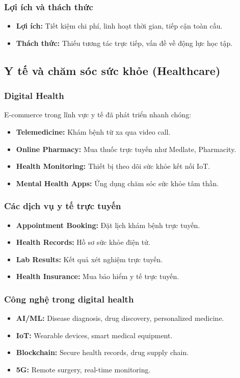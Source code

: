 \documentclass[a4paper,12pt]{report}
\begin{document}
\subsubsection{Lợi ích và thách thức}
\begin{itemize}
    \item \textbf{Lợi ích:} Tiết kiệm chi phí, linh hoạt thời gian, tiếp cận toàn cầu.
    \item \textbf{Thách thức:} Thiếu tương tác trực tiếp, vấn đề về động lực học tập.
\end{itemize}

\subsection{Y tế và chăm sóc sức khỏe (Healthcare)}

\subsubsection{Digital Health}
E-commerce trong lĩnh vực y tế đã phát triển nhanh chóng:
\begin{itemize}
    \item \textbf{Telemedicine:} Khám bệnh từ xa qua video call.
    \item \textbf{Online Pharmacy:} Mua thuốc trực tuyến như Medlate, Pharmacity.
    \item \textbf{Health Monitoring:} Thiết bị theo dõi sức khỏe kết nối IoT.
    \item \textbf{Mental Health Apps:} Ứng dụng chăm sóc sức khỏe tâm thần.
\end{itemize}

\subsubsection{Các dịch vụ y tế trực tuyến}
\begin{itemize}
    \item \textbf{Appointment Booking:} Đặt lịch khám bệnh trực tuyến.
    \item \textbf{Health Records:} Hồ sơ sức khỏe điện tử.
    \item \textbf{Lab Results:} Kết quả xét nghiệm trực tuyến.
    \item \textbf{Health Insurance:} Mua bảo hiểm y tế trực tuyến.
\end{itemize}

\subsubsection{Công nghệ trong digital health}
\begin{itemize}
    \item \textbf{AI/ML:} Disease diagnosis, drug discovery, personalized medicine.
    \item \textbf{IoT:} Wearable devices, smart medical equipment.
    \item \textbf{Blockchain:} Secure health records, drug supply chain.
    \item \textbf{5G:} Remote surgery, real-time monitoring.
\end{itemize}
\end{document}
